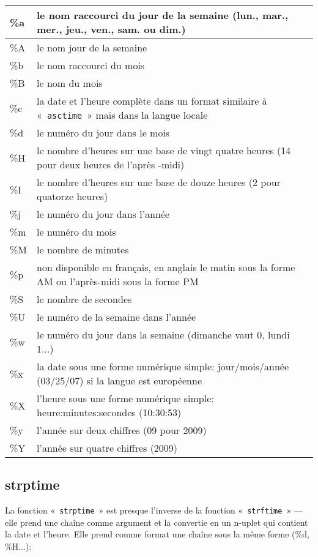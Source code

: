 \begin{center}
\begin{tabular}{|l|p{12cm}|}
\hline
\%a & le nom raccourci du jour de la semaine (lun., mar., mer., jeu., ven., sam. ou dim.) \\
\hline
\%A & le nom jour de la semaine  \\
\hline
\%b & le nom raccourci du mois \\
\hline
\%B & le nom du mois \\
\hline
\%c & la date et l'heure complète dans un format similaire à « \texttt{asctime} » mais dans la langue locale\\
\hline
\%d & le numéro du jour dans le mois\\
\hline
\%H & le nombre d'heures sur une base de vingt quatre heures (14 pour deux heures de l'après -midi) \\
\hline
\%I & le nombre d'heures sur une base de douze heures (2 pour quatorze heures)\\
\hline
\%j & le numéro du jour dans l'année\\
\hline
\%m & le numéro du mois \\
\hline
\%M & le nombre de minutes \\
\hline
\%p & non disponible en français, en anglais le matin sous la forme AM ou l'après-midi sous la forme PM \\
\hline
\%S & le nombre de secondes\\
\hline
\%U & le numéro de la semaine dans l'année \\
\hline
\%w & le numéro du jour dans la semaine (dimanche vaut 0, lundi 1...) \\
\hline
\%x & la date sous une forme numérique simple: jour/mois/année (03/25/07) si la langue est européenne  \\
\hline
\%X & l'heure sous une forme numérique simple: heure:minutes:secondes (10:30:53) \\
\hline
\%y & l'année sur deux chiffres (09 pour 2009) \\
\hline
\%Y & l'année sur quatre chiffres (2009) \\
\hline
\end{tabular}
\end{center}
\subsection{strptime}

La fonction « \texttt{strptime} » est presque l'inverse de la fonction « \texttt{strftime} » --- elle prend une chaîne comme argument et la convertie en un n-uplet qui contient la date et l'heure. Elle prend comme format une chaîne sous la même forme (\%d, \%H...):



